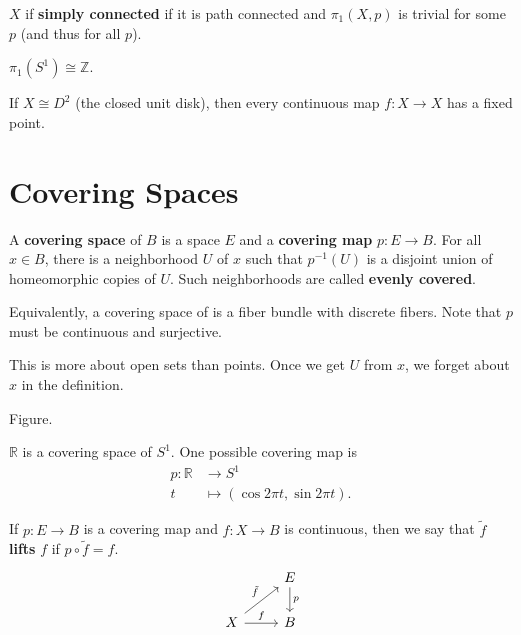 \documentclass[twoside,10pt]{report}
\begin{document}
\begin{defn}[]
	$X$ if \textbf{simply connected} if it is path connected and $\pi_1(X,p)$ is trivial for some $p$ (and thus for all $p$).
\end{defn}

\begin{thrm}[]
	$\pi_1(S^{1})\cong \mathbb{Z}$.
\end{thrm}

\begin{thrm}
	If $X \cong D^{2}$ (the closed unit disk), then every continuous map $f:X\to X$ has a fixed point.
\end{thrm}



\section{Covering Spaces}

\begin{defn}[]
	A \textbf{covering space} of $B$ is a space $E$ and a \textbf{covering map} $p:E\to B$. For all $x \in B$, there is a neighborhood $U$ of $x$ such that $p^{-1}(U)$ is a disjoint union of homeomorphic copies of $U$. Such neighborhoods are called \textbf{evenly covered}.
\end{defn}
Equivalently, a covering space of is a fiber bundle with discrete fibers. Note that $p$ must be continuous and surjective.

This is more about open sets than points. Once we get $U$ from $x$, we forget about $x$ in the definition.

{\color{red}Figure.}

\begin{ex}[]
	$\mathbb{R}$ is a covering space of $S^{1}$. One possible covering map is
		\begin{align*}
			p:\mathbb{R}&\to S^{1}\\
			t&\mapsto (\cos 2\pi t,\sin 2\pi t).
		\end{align*}
\end{ex}

\begin{defn}[]
If $p:E\to B$ is a covering map and $f:X\to B$ is continuous, then we say that $\tilde{f}$ \textbf{lifts} $f$ if $p \circ \tilde{f}=f$.
\[
\begin{tikzcd}
	&E\dar{p}\\
	X\rar{f}\arrow[ur,"\tilde{f}"]&B
\end{tikzcd}
\] 
\end{defn}
\end{document}

